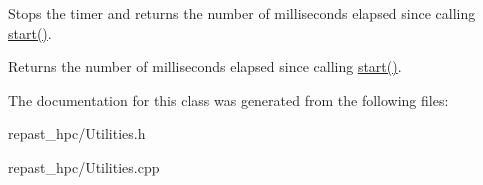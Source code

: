 Stops the timer and returns the number of milliseconds elapsed since calling \hyperlink{classrepast_1_1_timer_a6188a8aa6cc2ca98342fc0c37706f454}{start()}. 

\begin{DoxyReturn}{Returns}
the number of milliseconds elapsed since calling \hyperlink{classrepast_1_1_timer_a6188a8aa6cc2ca98342fc0c37706f454}{start()}. 
\end{DoxyReturn}


The documentation for this class was generated from the following files\-:\begin{DoxyCompactItemize}
\item 
repast\-\_\-hpc/Utilities.\-h\item 
repast\-\_\-hpc/Utilities.\-cpp\end{DoxyCompactItemize}
